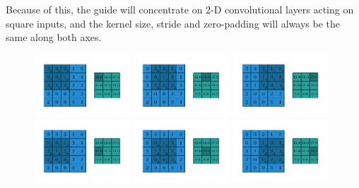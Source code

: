 \documentclass{report}
\begin{document}
Because of this, the guide will concentrate on 2-D convolutional layers acting
on square inputs, and the kernel size, stride and zero-padding will always be
the same along both axes.

\begin{figure}[p]
    \centering
    \includegraphics[width=0.32\textwidth]{pdf/numerical_no_padding_no_strides_00.pdf}
    \includegraphics[width=0.32\textwidth]{pdf/numerical_no_padding_no_strides_01.pdf}
    \includegraphics[width=0.32\textwidth]{pdf/numerical_no_padding_no_strides_02.pdf}
    \includegraphics[width=0.32\textwidth]{pdf/numerical_no_padding_no_strides_03.pdf}
    \includegraphics[width=0.32\textwidth]{pdf/numerical_no_padding_no_strides_04.pdf}
    \includegraphics[width=0.32\textwidth]{pdf/numerical_no_padding_no_strides_05.pdf}

\end{figure}
\end{document}
